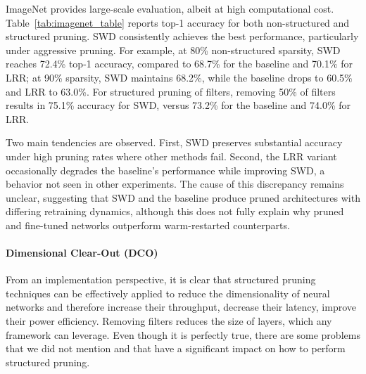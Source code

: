\documentclass[11pt]{report}
\begin{document}
\begin{table}[htp]
  \centering
  
  \caption{Non-structured and structured pruning on ResNet-50 with ImageNet ILSVRC2012. Comparison between a baseline method (Han \textit{et al.}~\cite{han2015learning} or Liu \textit{et al.}~\cite{liu2017learning}), its LRR variant~\cite{tanaka2020pruning}, and SWD.}
  \label{tab:imagenet_table}
\end{table}

ImageNet provides large-scale evaluation, albeit at high computational cost. Table~\ref{tab:imagenet_table} reports top-1 accuracy for both non-structured and structured pruning. SWD consistently achieves the best performance, particularly under aggressive pruning. For example, at 80\% non-structured sparsity, SWD reaches 72.4\% top-1 accuracy, compared to 68.7\% for the baseline and 70.1\% for LRR; at 90\% sparsity, SWD maintains 68.2\%, while the baseline drops to 60.5\% and LRR to 63.0\%. For structured pruning of filters, removing 50\% of filters results in 75.1\% accuracy for SWD, versus 73.2\% for the baseline and 74.0\% for LRR.

Two main tendencies are observed. First, SWD preserves substantial accuracy under high pruning rates where other methods fail. Second, the LRR variant~\cite{renda2020comparing} occasionally degrades the baseline’s performance while improving SWD, a behavior not seen in other experiments. The cause of this discrepancy remains unclear, suggesting that SWD and the baseline produce pruned architectures with differing retraining dynamics, although this does not fully explain why pruned and fine-tuned networks outperform warm-restarted counterparts.



\paragraph{Dimensional Clear-Out (DCO)}

From an implementation perspective, it is clear that structured pruning techniques can be effectively applied to reduce the dimensionality of neural networks and therefore increase their throughput, decrease their latency, improve their power efficiency. Removing filters reduces the size of layers, which any framework can leverage. Even though it is perfectly true, there are some problems that we did not mention and that have a significant impact on how to perform structured pruning.
\end{document}
